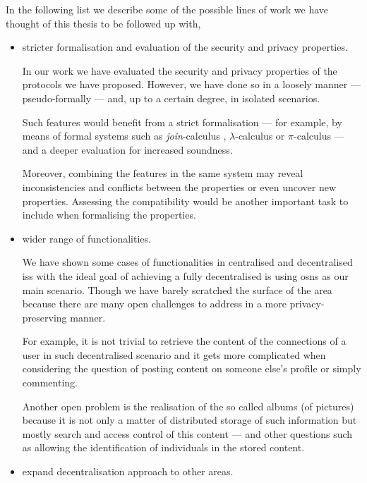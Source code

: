 In the following list we describe some of the possible lines of work we have thought 
of this thesis to be followed up with,
\begin{itemize}[topsep=\parskip, parsep=\parskip, itemsep=\parskip]
    
    \item stricter formalisation and evaluation of the security and privacy properties.
    
    In our work we have evaluated the security and privacy properties of the protocols 
    we have proposed. However, we have done so in a loosely manner --- pseudo-formally 
    --- and, up to a certain degree, in isolated scenarios.
    
    Such features would benefit from a strict formalisation --- for example, by 
    means of formal systems such as \emph{join}-calculus \cite{FournetG96}, \(\lambda\)-calculus 
    \cite{Church36} or \(\pi\)-calculus \cite{MilnerPW92} --- and a deeper evaluation 
    for increased soundness.
    
    Moreover, combining the features in the same system may reveal inconsistencies 
    and conflicts between the properties or even uncover new properties. Assessing 
    the compatibility would be another important task to include when formalising 
    the properties.
    
    \item wider range of functionalities.
    
    We have shown some cases of functionalities in centralised and decentralised 
    \acp{is} with the ideal goal of achieving a fully decentralised \ac{is} using 
    \acp{osn} as our main scenario. Though we have barely scratched the surface 
    of the area because there are many open challenges to address in a more privacy-preserving 
    manner.
    
    For example, it is not trivial to retrieve the content of the connections of 
    a user in such decentralised scenario and it gets more complicated when considering 
    the question of posting content on someone else's profile or simply commenting. 
    
    Another open problem is the realisation of the so called albums (of pictures) 
    because it is not only a matter of distributed storage of such information but 
    mostly search and access control of this content --- and other questions such 
    as allowing the identification of individuals in the stored content.
    
    \item expand decentralisation approach to other areas.
    

\end{itemize}
